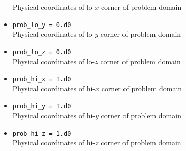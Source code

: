 \documentclass[11pt,letterpaper]{article}
\begin{document}
\begin{itemize}
  Physical coordinates of lo-$x$ corner of problem domain
\item {\tt prob\_lo\_y = 0.d0}\\
  Physical coordinates of lo-$y$ corner of problem domain
\item {\tt prob\_lo\_z = 0.d0}\\
  Physical coordinates of lo-$z$ corner of problem domain
\item {\tt prob\_hi\_x = 1.d0}\\
  Physical coordinates of hi-$x$ corner of problem domain
\item {\tt prob\_hi\_y = 1.d0}\\
  Physical coordinates of hi-$y$ corner of problem domain
\item {\tt prob\_hi\_z = 1.d0}\\
  Physical coordinates of hi-$z$ corner of problem domain
\end{itemize}
\end{document}

